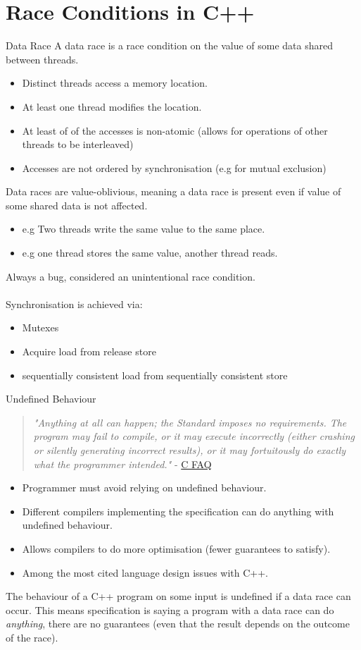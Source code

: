 \section{Race Conditions in C++}
\begin{definitionbox}{Data Race}
	A data race is a race condition on the value of some data shared between threads.
	\begin{itemize}
		\item Distinct threads access a memory location.
		\item At least one thread modifies the location.
		\item At least of of the accesses is non-atomic (allows for operations of other threads to be interleaved)
		\item Accesses are not ordered by synchronisation (e.g for mutual exclusion)
	\end{itemize}
	Data races are value-oblivious, meaning a data race is present even if value of some shared data is not affected.
	\begin{itemize}
		\item e.g Two threads write the same value to the same place.
		\item e.g one thread stores the same value, another thread reads.
	\end{itemize}
	Always a bug, considered an unintentional race condition.
	\\
	\\ Synchronisation is achieved via:
	\begin{itemize}
		\item Mutexes
		\item Acquire load from release store
		\item sequentially consistent load from sequentially consistent store
	\end{itemize}
\end{definitionbox}
\begin{definitionbox}{Undefined Behaviour}
	\begin{quote}
		\textit{"Anything at all can happen; the Standard imposes no requirements. The program
			may fail to compile, or it may execute incorrectly (either crashing or silently
			generating incorrect results), or it may fortuitously do exactly what the programmer
			intended."} - \href{https://c-faq.com/ansi/undef.html}{C FAQ}
	\end{quote}
	\begin{itemize}
		\item Programmer must avoid relying on undefined behaviour.
		\item Different compilers implementing the specification can do anything with undefined behaviour.
		\item Allows compilers to do more optimisation (fewer guarantees to satisfy).
		\item Among the most cited language design issues with C++.
	\end{itemize}
	The behaviour of a C++ program on some input is undefined if a data race can occur. This means
	specification is saying a program with a data race can do \textit{anything}, there are no guarantees (even that the result depends on the outcome of the race).
\end{definitionbox}
